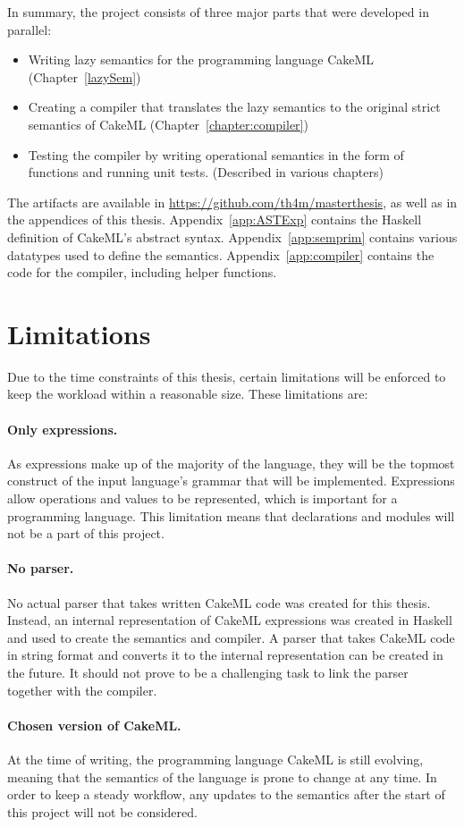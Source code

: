 In summary, the project consists of three major parts that were developed
in parallel:
\begin{itemize}
 \item Writing lazy semantics for the programming language CakeML (Chapter~\ref{lazySem})
 \item Creating a compiler that translates the lazy semantics to the original strict semantics of CakeML (Chapter~\ref{chapter:compiler})
 \item Testing the compiler by writing operational semantics in the form of functions and running unit tests. (Described in various chapters)
\end{itemize}

The artifacts are available in \url{https://github.com/th4m/masterthesis}, as
well as in the appendices of this thesis. Appendix~\ref{app:ASTExp} contains the
Haskell definition of CakeML's abstract syntax. Appendix~\ref{app:semprim}
contains various datatypes used to define the semantics.
Appendix~\ref{app:compiler} contains the code for the compiler, including helper
functions.

\section{Limitations}
\label{sec:limitations}
Due to the time constraints of this thesis, certain limitations will be enforced
to keep the workload within a reasonable size. These limitations are:

\paragraph{Only expressions.}
As expressions make up of the majority of the language, they will be the topmost
construct of the input language's grammar that will be implemented. Expressions
allow operations and values to be represented, which is important for a
programming language. This limitation means that declarations and modules will
not be a part of this project.

\paragraph{No parser.}
No actual parser that takes written CakeML code was created for this thesis.
Instead, an internal representation of CakeML expressions was created in
Haskell and used to create the semantics and compiler. A parser that
takes CakeML code in string format and converts it to the internal
representation can be created in the future. It should not prove to
be a challenging task to link the parser together with the compiler.

\paragraph{Chosen version of CakeML.}
At the time of writing, the programming language CakeML is still evolving,
meaning that the semantics of the language is prone to change at
any time. In order to keep a steady workflow, any updates to the semantics after
the start of this project will not be considered.

